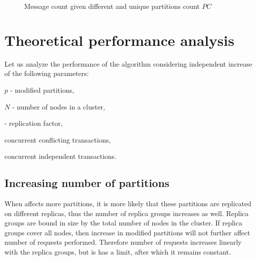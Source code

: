 \begin{figure}[hbt]
  \centering
  \setlength{\unitlength}{1.3cm}  
  \caption{Message count given different \RFalone and unique partitions count $PC$}
  \label{fig:tests:requestsCount}
\end{figure}

\section{Theoretical performance analysis}
Let us analyze the performance of the \mpt algorithm considering independent increase of the following parameters: 
\begin{enumerate*}[label=\alph*)]
\item $p$ - modified partitions,
\item $N$ - number of nodes in a cluster,
\item \RFalone - replication factor,
\item concurrent conflicting transactions,
\item concurrent independent transactions.
\end{enumerate*}

\subsection{Increasing number of partitions}
\label{sec:tests:perf:partitions}
When \mpt affects more partitions, it is more likely that these partitions are replicated on different replicas, thus the number of replica groups increases as well. Replica groups are bound in size by the total number of nodes in the cluster. If replica groups cover all nodes, then increase in modified partitions will not further affect number of requests performed. Therefore number of requests increases linearly with the replica groups, but is has a limit, after which it remains constant.

